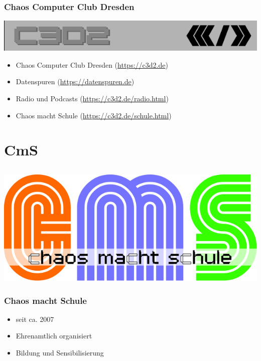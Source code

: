 \documentclass[12pt]{beamer}
\begin{document}
\begin{frame}
	\frametitle{Chaos Computer Club Dresden}
	\begin{center}
		\includegraphics[height=0.1\textheight]{img/c3d2_logo.png}
	\end{center}
	\begin{itemize}
		\item Chaos Computer Club Dresden (\url{https://c3d2.de})          
		\item Datenspuren (\url{https://datenspuren.de})
		\item Radio und Podcasts (\url{https://c3d2.de/radio.html})
		\item Chaos macht Schule (\url{https://c3d2.de/schule.html})
	\end{itemize}
\end{frame}
  

\section{CmS}
\subsection{}

\begin{frame}
	\begin{center}
    	\includegraphics[height=0.5\textheight]{img/cms-text.png}
    \end{center}
\end{frame}
  
\begin{frame}
	\frametitle{Chaos macht Schule}
	\begin{itemize}
		\item<1-> seit ca. 2007
		\item<2-> Ehrenamtlich organisiert
		\item<3-> Bildung und Sensibilisierung
	\end{itemize}
\end{frame}
  
\end{document}
